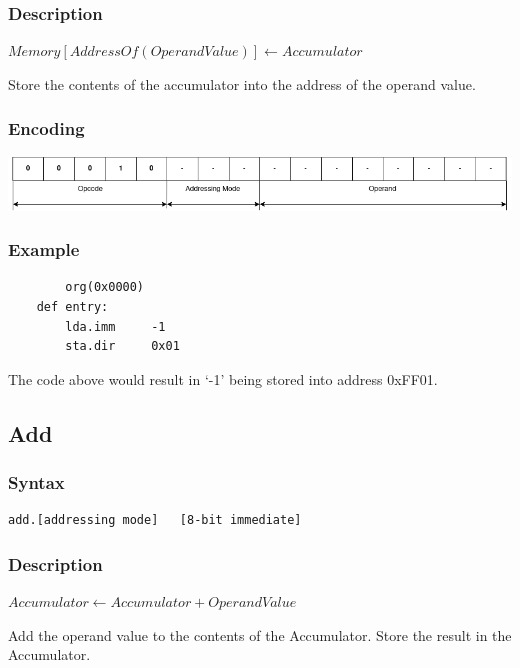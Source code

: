     \subsubsection{Description}
    $Memory[AddressOf(OperandValue)] \leftarrow Accumulator $ \\
    \par Store the contents of the accumulator into the address of the operand value.

    \subsubsection{Encoding}
    \begin{center}
        \includegraphics[scale=0.40]{img/Andromeda-STA.drawio}
    \end{center}

    \subsubsection{Example}
    \begin{verbatim}
        org(0x0000)
    def entry:
        lda.imm     -1
        sta.dir     0x01
    \end{verbatim}
    \par The code above would result in `-1' being stored into address 0xFF01.

\pagebreak
\subsection{Add}\label{subsec:add}
    \subsubsection{Syntax}
    \begin{verbatim}add.[addressing mode]   [8-bit immediate]\end{verbatim}

    \subsubsection{Description}
    $Accumulator \leftarrow Accumulator + OperandValue$
    \par Add the operand value to the contents of the Accumulator.
    Store the result in the Accumulator.


